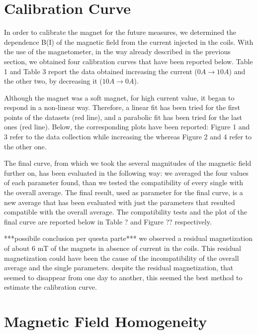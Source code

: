 \documentclass[a4paper,12pt,abstracton]{scrartcl}
\begin{document}
\section{Calibration Curve}
In order to calibrate the magnet for the future measures, we determined the dependence B(I) of the magnetic field from the current injected in the coils. With the use of the magnetometer, in the way already described in the previous section, we obtained four calibration curves that have been reported below. Table 1 and Table 3 report the data obtained increasing the current ($0A \longrightarrow 10A$) and the other two, by decreasing it ($10A \longrightarrow 0A$). 



Although the magnet was a soft magnet, for high current value, it began to respond in a non-linear way. Therefore, a linear fit has been tried for the first points of the datasets (red line), and a parabolic fit has been tried for the last ones (red line). Below, the corresponding plots have been reported: Figure 1 and 3 refer to the data collection while increasing the whereas Figure 2 and 4 refer to the other one.


The final curve, from which we took the several magnitudes of the magnetic field further on, has been evaluated in the following way: we averaged the four values of each parameter found, than we tested the compatibility of every single with the overall average. The final result, used as parameter for the final curve, is a new average that has been evaluated with just the parameters that resulted compatible with the overall average. The compatibility tests and the plot of the final curve are reported below in Table ? and Figure ?? respectively.


***possibile conclusion per questa parte***
we observed a residual magnetization of about 6 mT of the magnets in absence of current in the coils. This residual magnetization could have been the cause of the incompatibility of the overall average and the single parameters. despite the residual magnetization, that seemed to disappear from one day to another, this seemed the best method to estimate the calibration curve.

\section{Magnetic Field Homogeneity}
\end{document}
